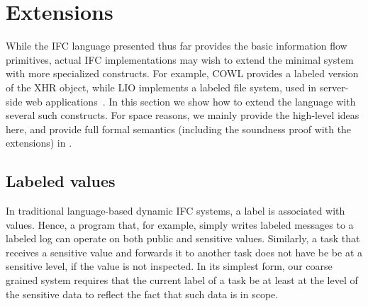 \section{Extensions}
\label{sec:extensions}
\label{sec:extensions:labeled}


While the IFC language presented thus far provides the basic
information flow primitives, actual IFC implementations
may wish to extend the minimal system with more specialized
constructs.
For example, COWL provides a labeled version of the XHR object, while
LIO implements a labeled file system, used in server-side web
applications~\cite{hails}.
In this section we show how to extend the language with several such
constructs.  For space reasons, we mainly provide the high-level
ideas here, and provide full formal semantics (including the soundness
proof with the extensions) in \appendixextfirst{}.
%

\subsection{Labeled values}
In traditional language-based dynamic IFC systems, a label is
associated with values.
%
Hence, a program that, for example, simply writes labeled messages to
a labeled log can operate on both public and sensitive values.
Similarly, a task that receives a sensitive value and forwards it
to another task does not have be be at a sensitive level, if the
value is not inspected.
%
In its simplest form, our coarse grained system requires that the
current label of a task be at least at the level of the sensitive data
to reflect the fact that such data is in scope.

